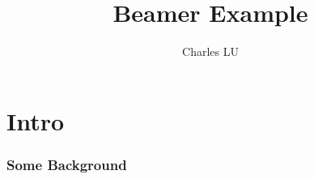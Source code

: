 \documentclass{beamer}
\title{Beamer Example}
\author{Charles LU}
\begin{document}
\maketitle

\section{Intro}
\begin{frame}
\frametitle{Some Background}

\end{frame}
\end{document}

